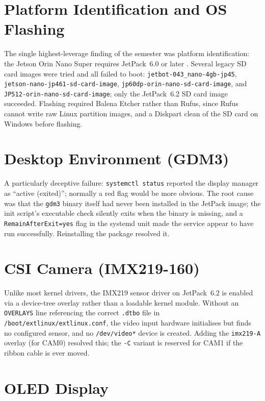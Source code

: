 \documentclass{imc-inf}
\begin{document}
\section{Platform Identification and OS Flashing}
\label{sec:platform-id}

The single highest-leverage finding of the semester was platform identification:
the Jetson Orin Nano Super requires JetPack~6.0 or later \cite{nvidia_jetpack}. Several legacy SD card
images were tried and all failed to boot:
\texttt{jetbot-043\_nano-4gb-jp45},
\texttt{jetson-nano-jp461-sd-card-image},
\texttt{jp60dp-orin-nano-sd-card-image}, and
\texttt{JP512-orin-nano-sd-card-image};
only the JetPack~6.2 SD card image succeeded.
Flashing required Balena Etcher rather than Rufus, since Rufus cannot write raw
Linux partition images, and a Diskpart clean of the SD card on Windows before
flashing.

\section{Desktop Environment (GDM3)}
\label{sec:gdm3}

A particularly deceptive failure: \texttt{systemctl status} reported the display
manager as ``active (exited)''; normally a red flag would be more obvious. The
root cause was that the \texttt{gdm3} binary itself had never been installed in the
JetPack image; the init script's executable check silently exits when the binary
is missing, and a \texttt{RemainAfterExit=yes} flag in the systemd unit made the
service appear to have run successfully. Reinstalling the package resolved it.

\section{CSI Camera (IMX219-160)}
\label{sec:csi-camera}

Unlike most kernel drivers, the IMX219 sensor driver on JetPack~6.2 is enabled via
a device-tree overlay rather than a loadable kernel module. Without an
\texttt{OVERLAYS} line referencing the correct \texttt{.dtbo} file in
\texttt{/boot/extlinux/extlinux.conf}, the video input hardware initialises but
finds no configured sensor, and no \texttt{/dev/video*} device is created. Adding
the \texttt{imx219-A} overlay (for CAM0) resolved this; the \texttt{-C} variant
is reserved for CAM1 if the ribbon cable is ever moved.

\section{OLED Display}
\label{sec:oled}
\end{document}
